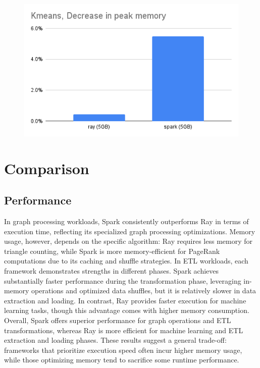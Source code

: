 \documentclass[conference]{IEEEtran}
\begin{document}
\begin{figure}[H]\centering
\includegraphics[width=0.9\columnwidth]{22}
\end{figure}



\section{Comparison}

\subsection{Performance}

In graph processing workloads, Spark consistently outperforms Ray in
terms of execution time, reflecting its specialized graph processing
optimizations. Memory usage, however, depends on the specific
algorithm: Ray requires less memory for triangle counting, while
Spark is more memory-efficient for PageRank computations due to its
caching and shuffle strategies. In ETL workloads, each framework
demonstrates strengths in different phases. Spark achieves
substantially faster performance during the transformation phase,
leveraging in-memory operations and optimized data shuffles, but it
is relatively slower in data extraction and loading. In contrast,
Ray provides faster execution for machine learning tasks, though this
advantage comes with higher memory consumption. Overall, Spark offers
superior performance for graph operations and ETL transformations,
whereas Ray is more efficient for machine learning and ETL extraction
and loading phases. These results suggest a general trade-off:
frameworks that prioritize execution speed often incur higher memory
usage, while those optimizing memory tend to sacrifice some runtime
performance.
\end{document}
